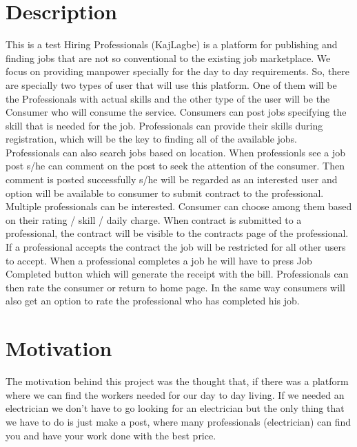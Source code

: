 
\section{Description}
This is a test Hiring Professionals (KajLagbe) is a platform for publishing and finding jobs that are not so conventional to the existing job marketplace. We focus on providing manpower specially for the day to day requirements.
\newline 
\newline
So, there are specially two types of user that will use this platform. One of them will be the Professionals with actual skills and the other type of the user will be the Consumer who will consume the service.
\newline
\newline
Consumers can post jobs specifying the skill that is needed for the job.
Professionals can provide their skills during registration, which will be the key to finding all of the available jobs. Professionals can also search jobs based on location.
\newline
\newline
When professionls see a job post s/he can comment on the post to seek the attention of the consumer. Then comment is posted successfully s/he will be regarded as an interested user and option will be available to consumer to submit contract to the professional. Multiple professionals can be interested. Consumer can choose among them based on their rating / skill / daily charge.
\newline
\newline
When contract is submitted to a professional, the contract will be visible to the contracts page of the professional. If a professional accepts the contract the job will be restricted for all other users to accept.
\newline
\newline
When a professional completes a job he will have to press Job Completed button which will generate the receipt with the bill. Professionals can then rate the consumer or return to home page. In the same way consumers will also get an option to rate the professional who has completed his job. 

\clearpage

\section{Motivation}
The motivation behind this project was the thought that, if there was a platform where we can find the workers needed for our day to day living. If we needed an electrician we don't have to go looking for an electrician but the only thing that we have to do is just make a post, where many professionals (electrician) can find you and have your work done with the best price.
\clearpage

